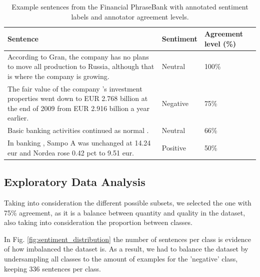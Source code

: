 \documentclass[conference]{IEEEtran}
\begin{document}



\begin{table}[ht]
\centering
\caption{Example sentences from the Financial PhraseBank with annotated sentiment labels and annotator agreement levels.}
\label{tab:fpb_examples}
\begin{tabular}{p{4.0cm}p{1.8cm}p{1.5cm}}
\toprule
\textbf{Sentence} & \textbf{Sentiment} & \textbf{Agreement level (\%)} \\
\midrule
According to Gran, the company has no plans to move all production to Russia, although that is where the company is growing. & Neutral & 100\% \\
The fair value of the company 's investment properties went down to EUR 2.768 billion at the end of 2009 from EUR 2.916 billion a year earlier. & Negative & 75\% \\
Basic banking activities continued as normal . & Neutral & 66\% \\
In banking , Sampo A was unchanged at 14.24 eur and Nordea rose 0.42 pct to 9.51 eur. & Positive & 50\% \\
\bottomrule
\end{tabular}
\end{table}

\subsection{Exploratory Data Analysis}

Taking into consideration the different possible subsets, we selected the one with 75\% agreement, as it is a balance between quantity and quality in the dataset, also taking into consideration the proportion between classes.

In Fig. \ref{fig:sentiment_distribution} the number of sentences per class is evidence of how imbalanced the dataset is. As a result, we had to balance the dataset by undersampling all classes to the amount of examples for the 'negative' class, keeping 336 sentences per class.

\end{document}

